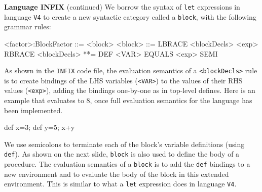 \begin{minipage}[t]{\sw}
\slidenumber
\LARGE
{\bf Language INFIX} (continued)\exx
We borrow the syntax of \verb'let' expressions in language \verb'V4'
to create a new syntactic category called a \verb'block',
with the following grammar rules:
\Large
\begin{qv}
<factor>:BlockFactor ::= <block>
<block>              ::= LBRACE <blockDecls> <exp> RBRACE
<blockDecls>         **= DEF <VAR> EQUALS <exp> SEMI
\end{qv}
\LARGE
As shown in the \verb'INFIX' code file,
the evaluation semantics of a \verb'<blockDecls>' rule is
to create bindings of the LHS variables (\verb'<VAR>')
to the values of their RHS values (\verb'<exp>'),
adding the bindings one-by-one as in top-level defines.
Here is an example that evaluates to 8, once full evaluation
semantics for the language has been implemented.
\Large
\begin{qv}
{
  def x=3;
  def y=5;
  x+y
}
\end{qv}
\LARGE
We use semicolons to terminate
each of the block's variable definitions (using \verb'def').
As shown on the next slide,
\verb'block' is also used to define the body of a procedure.\exx
The evaluation semantics of a \verb'block' is
to add the \verb'def' bindings to a new environment
and to evaluate the body of the block in this extended environment.
This is similar to what a \verb'let' expression does in language \verb'V4'.
\end{minipage}
